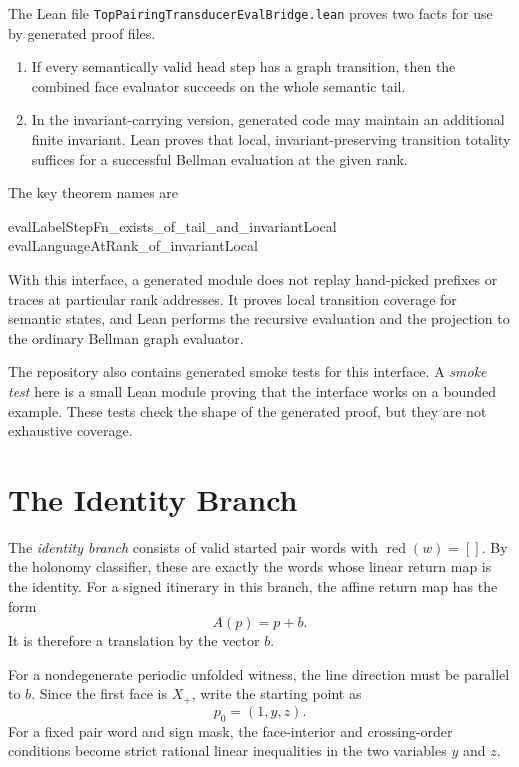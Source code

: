 \documentclass[11pt]{article}
\newcommand{\red}{\operatorname{red}}
\begin{document}
The Lean file \texttt{TopPairingTransducerEvalBridge.lean} proves two facts
for use by generated proof files.
\begin{enumerate}[leftmargin=2em]
\item If every semantically valid head step has a graph transition, then the
  combined face evaluator succeeds on the whole semantic tail.
\item In the invariant-carrying version, generated code may maintain an
  additional finite invariant.  Lean proves that local, invariant-preserving
  transition totality suffices for a successful Bellman evaluation at the
  given rank.
\end{enumerate}
The key theorem names are
\begin{center}
{\small\ttfamily evalLabelStepFn\_exists\_of\_tail\_and\_invariantLocal}\\
{\small\ttfamily evalLanguageAtRank\_of\_invariantLocal}
\end{center}
With this interface, a generated module does not replay hand-picked prefixes
or traces at particular rank addresses.  It proves local transition coverage
for semantic states, and Lean performs the recursive evaluation and the
projection to the ordinary Bellman graph evaluator.

The repository also contains generated smoke tests for this interface.  A
\emph{smoke test} here is a small Lean module proving that the interface
works on a bounded example.  These tests check the shape of the generated
proof, but they are not exhaustive coverage.

\section{The Identity Branch}
\label{sec:translation}

The \emph{identity branch} consists of valid started pair words with
\(\red(w)=[]\).  By the holonomy classifier, these are exactly the words whose
linear return map is the identity.  For a signed itinerary in this branch,
the affine return map has the form
\[
  A(p)=p+b.
\]
It is therefore a translation by the vector \(b\).

For a nondegenerate periodic unfolded witness, the line direction must be
parallel to \(b\).  Since the first face is \(X_+\), write the starting point
as
\[
  p_0=(1,y,z).
\]
For a fixed pair word and sign mask, the face-interior and crossing-order
conditions become strict rational linear inequalities in the two variables
\(y\) and \(z\).
\end{document}
